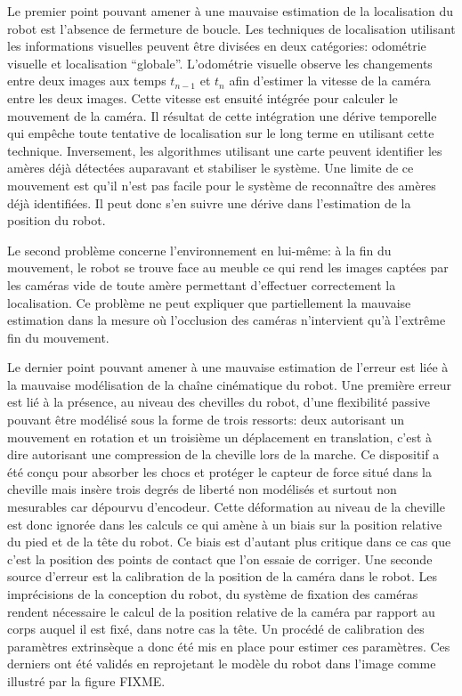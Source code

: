 Le premier point pouvant amener à une mauvaise estimation de la
localisation du robot est l'absence de fermeture de boucle. Les
techniques de localisation utilisant les informations visuelles
peuvent être divisées en deux catégories: odométrie visuelle et
localisation ``globale''. L'odométrie visuelle observe les changements
entre deux images aux temps $t_{n-1}$ et $t_n$ afin d'estimer la
vitesse de la caméra entre les deux images. Cette vitesse est ensuité
intégrée pour calculer le mouvement de la caméra. Il résultat de cette
intégration une dérive temporelle qui empêche toute tentative de
localisation sur le long terme en utilisant cette
technique. Inversement, les algorithmes utilisant une carte peuvent
identifier les amères déjà détectées auparavant et stabiliser le
système. Une limite de ce mouvement est qu'il n'est pas facile pour le
système de reconnaître des amères déjà identifiées. Il peut donc s'en
suivre une dérive dans l'estimation de la position du robot.


Le second problème concerne l'environnement en lui-même: à la fin du
mouvement, le robot se trouve face au meuble ce qui rend les images
captées par les caméras vide de toute amère permettant d'effectuer
correctement la localisation. Ce problème ne peut expliquer que
partiellement la mauvaise estimation dans la mesure où l'occlusion des
caméras n'intervient qu'à l'extrême fin du mouvement.


Le dernier point pouvant amener à une mauvaise estimation de l'erreur
est liée à la mauvaise modélisation de la chaîne cinématique du
robot. Une première erreur est lié à la présence, au niveau des
chevilles du robot, d'une flexibilité passive pouvant être modélisé
sous la forme de trois ressorts: deux autorisant un mouvement en
rotation et un troisième un déplacement en translation, c'est à dire
autorisant une compression de la cheville lors de la marche. Ce
dispositif a été conçu pour absorber les chocs et protéger le capteur
de force situé dans la cheville mais insère trois degrés de liberté
non modélisés et surtout non mesurables car dépourvu d'encodeur. Cette
déformation au niveau de la cheville est donc ignorée dans les calculs
ce qui amène à un biais sur la position relative du pied et de la tête
du robot. Ce biais est d'autant plus critique dans ce cas que c'est la
position des points de contact que l'on essaie de corriger. Une
seconde source d'erreur est la calibration de la position de la caméra
dans le robot. Les imprécisions de la conception du robot, du système
de fixation des caméras rendent nécessaire le calcul de la position
relative de la caméra par rapport au corps auquel il est fixé, dans
notre cas la tête. Un procédé de calibration des paramètres
extrinsèque a donc été mis en place pour estimer ces paramètres. Ces
derniers ont été validés en reprojetant le modèle du robot dans
l'image comme illustré par la figure FIXME.


